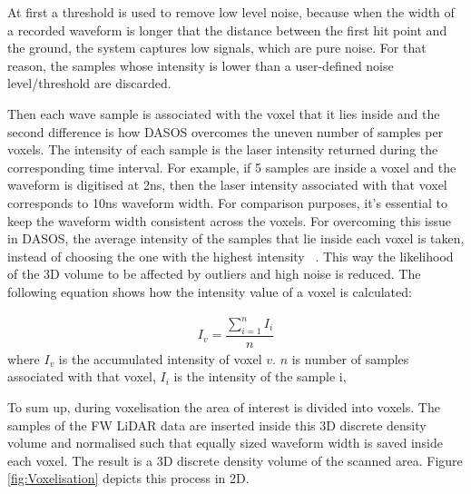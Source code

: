 \documentclass{subfiles}
\begin{document}
\par At first a threshold is used to remove low level noise, because when the width of a recorded waveform is longer that the distance between the first hit point and the ground, the system captures low signals, which are pure noise. For that reason, the samples whose intensity is lower than a user-defined noise level/threshold are discarded. 


\par Then each wave sample is associated with the voxel that it lies inside and the second difference is how DASOS overcomes the uneven number of samples per voxels. The intensity of each sample is the laser intensity returned during the corresponding time interval. For example, if 5 samples are inside a voxel and the waveform is digitised at 2ns, then the laser intensity associated with that voxel corresponds to 10ns waveform width. For comparison purposes, it's essential to keep the waveform width consistent across the voxels. For overcoming this issue in DASOS, the average intensity of the samples that lie inside each voxel is taken, instead of choosing the one with the highest intensity ~\cite{Persson2005}. This way the likelihood of the 3D volume to be affected by outliers and high noise is reduced. The following equation shows how the intensity value of a voxel is calculated:
 
	\begin{eqnarray}
	I_{v} = \dfrac{\sum_{i=1}^{n}I_{i}}{n}
	\end{eqnarray} 
	where 		$I_{v}$ is the accumulated intensity of voxel $v$. 
	$n$ is number of samples associated with that voxel, 
	$I_{i}$ is the intensity of the sample i, 

To sum up, during voxelisation the area of interest is divided into voxels. The samples of the FW LiDAR data are inserted inside this 3D discrete density volume and normalised such that equally sized waveform width is saved inside each voxel. The result is a 3D discrete density volume of the scanned area. Figure \ref{fig:Voxelisation} depicts this process in 2D.
\end{document}
